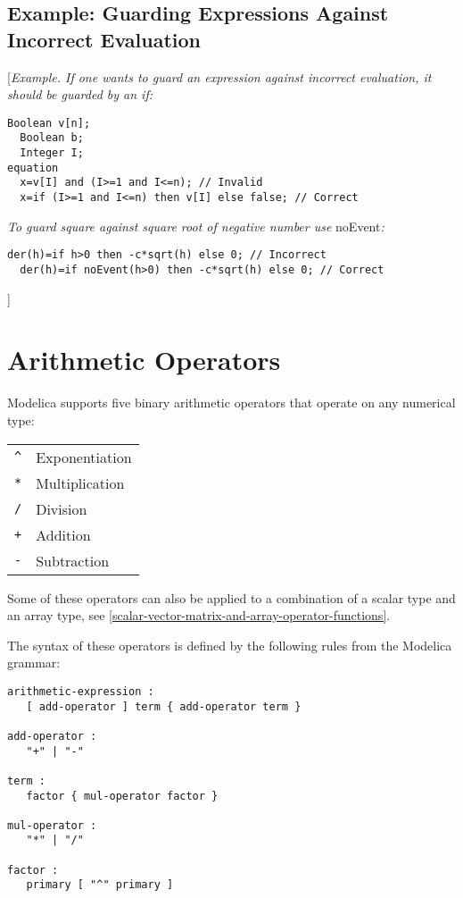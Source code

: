 \subsection{Example: Guarding Expressions Against Incorrect Evaluation}

{[}\emph{Example. If one wants to guard an expression against incorrect
evaluation, it should be guarded by an if:}

\begin{lstlisting}[language=modelica]
  Boolean v[n];
  Boolean b;
  Integer I;
equation
  x=v[I] and (I>=1 and I<=n); // Invalid
  x=if (I>=1 and I<=n) then v[I] else false; // Correct
\end{lstlisting}

\emph{To guard square against square root of negative number use}
noEvent\emph{:}
\begin{lstlisting}[language=modelica]
  der(h)=if h>0 then -c*sqrt(h) else 0; // Incorrect
  der(h)=if noEvent(h>0) then -c*sqrt(h) else 0; // Correct
\end{lstlisting}
{]}

\section{Arithmetic Operators}

Modelica supports five binary arithmetic operators that operate on any
numerical type:

\begin{longtable}[c]{ll}
\lstinline[basicstyle=\ttfamily]!^! & Exponentiation\\
\lstinline[basicstyle=\ttfamily]!*! & Multiplication\\ 
\lstinline[basicstyle=\ttfamily]!/! & Division\\ 
\lstinline[basicstyle=\ttfamily]!+! & Addition\\ 
\lstinline[basicstyle=\ttfamily]!-! & Subtraction\\
\end{longtable}

Some of these operators can also be applied to a combination of a scalar
type and an array type, see \autoref{scalar-vector-matrix-and-array-operator-functions}.

The syntax of these operators is defined by the following rules from the
Modelica grammar:

\begin{lstlisting}[language=grammar]
arithmetic-expression :
   [ add-operator ] term { add-operator term }

add-operator :
   "+" | "-"
   
term :
   factor { mul-operator factor }

mul-operator :
   "*" | "/"
   
factor :
   primary [ "^" primary ]
\end{lstlisting}

